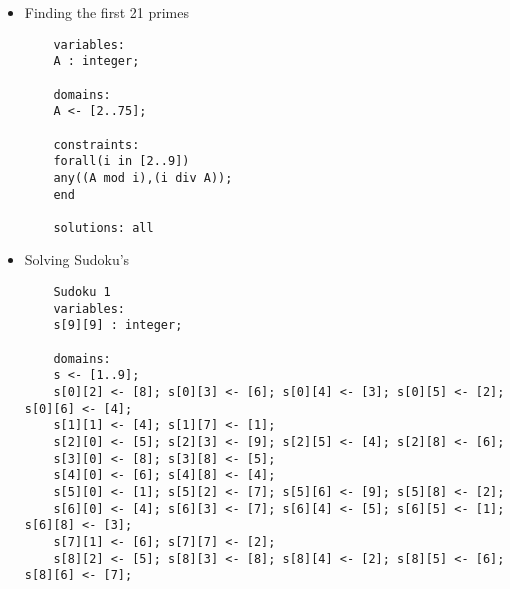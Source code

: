 \documentclass{article}
\begin{document}
\begin{itemize}
\begin{lstlisting}
	UN + UN + NEUF = ONZE
	variables:
	U,N,E,F,O,Z : integer;
	X1, X2, X3 : integer;
	
	domains:
	U,N,E,F, Z <- [0..9];
	O <- [1..9];
	X1, X2 <- [0..2];
	X3 <- [0,1];
	
	constraints:
	alldiff(U,N,E,F,O,Z);
	N + N + F = E + 10 *X1;
	X1 + U + U + U= Z + 10 * X2;
	X2 + E = N + 10 * X3;
	X3 + N = O;
	
	solutions: all 
	
	ONE + ONE + NINE + TWENTY + FIFTY = EIGHTY
	variables:
	O, N, E, I, T, W, Y, F, G, H : integer;
	X1, X2, X3, X4, X5 : integer;
	
	domains:
	I, W, G, H <- [0..9];
	O, N, T, F, E <- [1..9]; 
	Y <- [0,2,4,6,8]; 
	X1, X2 <- [1,2];
	X3 <- [0..3];
	X4 <- [0..2];
	X5 <- [1];
	
	constraints:
	W + F + X4 > 10;
	alldiff(O, N, E, I, T, W, Y, F, G, H);
	E + E + Y =10 *X1;
	X1 + N + N + T= 10 * X2;
	X2 + O + I + N + F = H + 10 * X3;
	X3 + N + E + I = G + 10 * X4;
	X4 + W + F = I + 10 * X5;
	X5 + T = E;
	
	solutions: all 
	
	I + GUESS + THE + TRUTH = HURTS
	variables:
	I, G, U, E, S, T, H, R : integer;
	X1, X2, X3, X4 : integer;
	
	domains:
	U, E, S, R <- [0..9];
	I, G, T, H <- [1..9];
	X1 <- [0..3];
	X2, X3 <- [0..2];
	X4 <- [0..1];
	
	constraints:
	alldiff(I, G, U, E, S, T, H, R);
	I + S + E + H = S + 10 * X1;
	X1 + S + H + T = T + 10 * X2;
	X2 + E + T + U = R + 10 * X3;
	X3 + U + R = U + 10 * X4;
	X4 + G + T = H;
	
	solutions: all 
	\end{lstlisting}
	
	\item Finding the first 21 primes
	\begin{lstlisting}
	variables:
	A : integer;
	
	domains:
	A <- [2..75];
	
	constraints:
	forall(i in [2..9])
	any((A mod i),(i div A)); 
	end
	
	solutions: all 
	\end{lstlisting}
	
	\item Solving Sudoku's
	\begin{lstlisting}
	Sudoku 1	
	variables:
	s[9][9] : integer;
	
	domains:
	s <- [1..9];
	s[0][2] <- [8]; s[0][3] <- [6]; s[0][4] <- [3]; s[0][5] <- [2]; s[0][6] <- [4];
	s[1][1] <- [4]; s[1][7] <- [1];
	s[2][0] <- [5]; s[2][3] <- [9]; s[2][5] <- [4]; s[2][8] <- [6];
	s[3][0] <- [8]; s[3][8] <- [5];
	s[4][0] <- [6]; s[4][8] <- [4];
	s[5][0] <- [1]; s[5][2] <- [7]; s[5][6] <- [9]; s[5][8] <- [2];
	s[6][0] <- [4]; s[6][3] <- [7]; s[6][4] <- [5]; s[6][5] <- [1]; s[6][8] <- [3];
	s[7][1] <- [6]; s[7][7] <- [2];
	s[8][2] <- [5]; s[8][3] <- [8]; s[8][4] <- [2]; s[8][5] <- [6]; s[8][6] <- [7];
	

\end{lstlisting}
\end{itemize}
\end{document}
